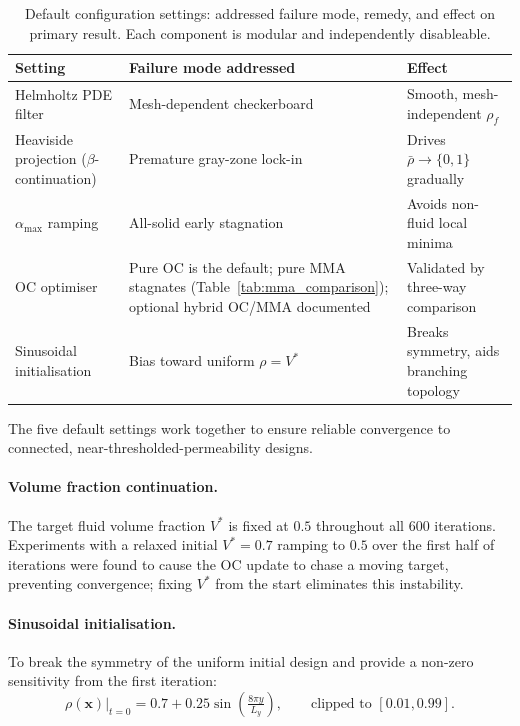 \begin{table}[h]
\centering\small
\caption{Default configuration settings: addressed failure mode,
         remedy, and effect on primary result.
         Each component is modular and independently disableable.}
\label{tab:continuation}
\begin{tabular}{@{}p{2.6cm}p{3.4cm}p{4.4cm}@{}}
\toprule
\textbf{Setting} & \textbf{Failure mode addressed} & \textbf{Effect} \\
\midrule
Helmholtz PDE filter & Mesh-dependent checkerboard & Smooth, mesh-independent $\rho_f$ \\
Heaviside projection ($\beta$-continuation) & Premature gray-zone lock-in & Drives $\bar\rho\to\{0,1\}$ gradually \\
$\alpha_{\max}$ ramping & All-solid early stagnation & Avoids non-fluid local minima \\
OC optimiser & Pure OC is the default; pure MMA stagnates (Table~\ref{tab:mma_comparison}); optional hybrid OC/MMA documented & Validated by three-way comparison \\ 
Sinusoidal initialisation & Bias toward uniform $\rho=V^*$ & Breaks symmetry, aids branching topology \\
\bottomrule
\end{tabular}
\end{table}


\label{sec:continuation}
The five default settings work together to ensure reliable convergence to
connected, near-thresholded-permeability designs.

\paragraph{Volume fraction continuation.}
The target fluid volume fraction $V^*$ is fixed at $0.5$ throughout
all 600 iterations.
Experiments with a relaxed initial $V^*=0.7$ ramping to $0.5$ over
the first half of iterations were found to cause the OC update to
chase a moving target, preventing convergence; fixing $V^*$ from the
start eliminates this instability.

\paragraph{Sinusoidal initialisation.}
To break the symmetry of the uniform initial design and provide a
non-zero sensitivity from the first iteration:
\begin{equation}
  \rho(\mathbf{x})\big|_{t=0}
  = 0.7 + 0.25\sin\!\left(\tfrac{8\pi y}{L_y}\right),
  \qquad \text{clipped to } [0.01, 0.99].
  \label{eq:sinusoidal_init}
\end{equation}

